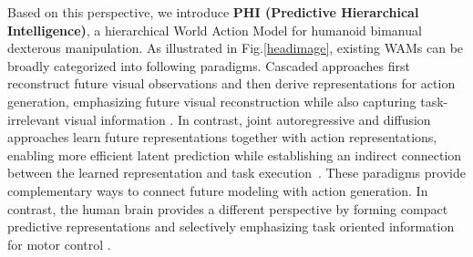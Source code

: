 \documentclass{article} %
\begin{document}
Based on this perspective, we introduce \textbf{PHI (Predictive Hierarchical Intelligence)}, a hierarchical World Action Model for humanoid bimanual dexterous manipulation. As illustrated in Fig.\ref{headimage}, existing WAMs can be broadly categorized into following paradigms. Cascaded approaches first reconstruct future visual observations and then derive representations for action generation, emphasizing future visual reconstruction while also capturing task-irrelevant visual information \cite{cheang2024gr2}. In contrast, joint autoregressive and diffusion approaches learn future representations together with action representations, enabling more efficient latent prediction while establishing an indirect connection between the learned representation and task execution~\cite{sun2026vlajepa,motubrainteam2026motubrainadvancedworldaction}. These paradigms provide complementary ways to connect future modeling with action generation. In contrast, the human brain provides a different perspective by forming compact predictive representations and selectively emphasizing task oriented information for motor control \cite{nguyen2025cerebellar,gao2018cortico}.


\end{document}
